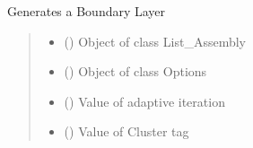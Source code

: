 \documentclass[letterpaper,10pt,english]{sphinxmanual}
\begin{document}

\begin{fulllineitems}
\label{\detokenize{modules:su2.generate_BL}}
\pysigstartsignatures
{}
\pysigstopsignatures
\sphinxAtStartPar
Generates a Boundary Layer
\begin{quote}\begin{description}
\begin{itemize}
\item {} 
\sphinxAtStartPar
{} () \textendash{} Object of class List\_Assembly

\item {} 
\sphinxAtStartPar
{} ({\hyperref[\detokenize{modules:configuration.Options}]{}}) \textendash{} Object of class Options

\item {} 
\sphinxAtStartPar
{} () \textendash{} Value of adaptive iteration

\item {} 
\sphinxAtStartPar
{} () \textendash{} Value of Cluster tag

\end{itemize}

\end{description}\end{quote}

\end{fulllineitems}

\end{document}
